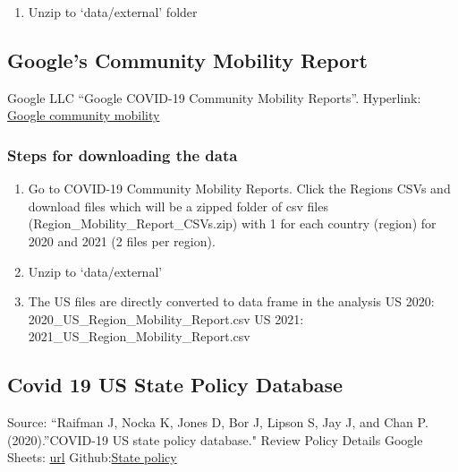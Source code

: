 \documentclass[
]{article}
\providecommand{\tightlist}{%
  \setlength{\itemsep}{0pt}\setlength{\parskip}{0pt}}
\begin{document}
\begin{enumerate}
\def\labelenumi{\arabic{enumi}.}
\setcounter{enumi}{2}
\tightlist
\item
  Unzip to `data/external' folder
\end{enumerate}

\hypertarget{googles-community-mobility-report}{%
\subsection{Google's Community Mobility
Report}\label{googles-community-mobility-report}}

Google LLC ``Google COVID-19 Community Mobility Reports''. Hyperlink:
\href{https://www.google.com/covid19/mobility/}{Google community
mobility}

\hypertarget{steps-for-downloading-the-data-2}{%
\subsubsection{Steps for downloading the
data}\label{steps-for-downloading-the-data-2}}

\begin{enumerate}
\def\labelenumi{\arabic{enumi}.}
\tightlist
\item
  Go to COVID-19 Community Mobility Reports. Click the Regions CSVs and
  download files which will be a zipped folder of csv files
  (Region\_Mobility\_Report\_CSVs.zip) with 1 for each country (region)
  for 2020 and 2021 (2 files per region).
\item
  Unzip to `data/external'
\item
  The US files are directly converted to data frame in the analysis US
  2020: 2020\_US\_Region\_Mobility\_Report.csv US 2021:
  2021\_US\_Region\_Mobility\_Report.csv
\end{enumerate}

\hypertarget{covid-19-us-state-policy-database-1}{%
\subsection{Covid 19 US State Policy
Database}\label{covid-19-us-state-policy-database-1}}

Source: ``Raifman J, Nocka K, Jones D, Bor J, Lipson S, Jay J, and Chan
P. (2020).''COVID-19 US state policy database." Review Policy Details
Google Sheets: \href{www.tinyurl.com/statepolicies}{url}
Github:\href{https://github.com/USCOVIDpolicy/COVID-19-US-State-Policy-Database}{State
policy}
\end{document}

